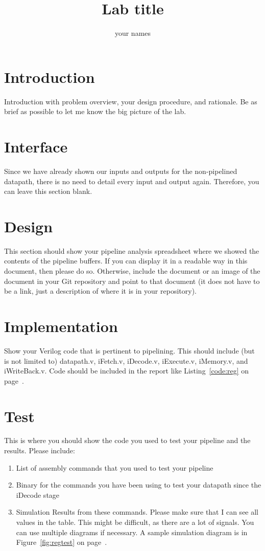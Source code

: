 \documentclass{article}
\author{your names}
\title{Lab title}
\newcommand{\Verilog}[3]{
  \lstset{language=Verilog}
  \lstset{backgroundcolor=\color{listinggray},rulecolor=\color{blue}}
  \lstset{linewidth=\textwidth}
  \lstset{commentstyle=\textit, stringstyle=\upshape,showspaces=false}
  \lstset{frame=tb}
  
}
\begin{document}
\maketitle

\section{Introduction}
Introduction with problem overview, your design procedure, and rationale.  Be as brief as possible to let me know the big picture of the lab.

\section{Interface}
Since we have already shown our inputs and outputs for the non-pipelined datapath, there is no need to detail every input and output again.  Therefore, you can leave this section blank.  

\section{Design}
This section should show your pipeline analysis spreadsheet where we showed the contents of the pipeline buffers.  If you can display it in a readable way in this document, then please do so.  Otherwise, include the document or an image of the document in your Git repository and point to that document (it does not have to be a link, just a description of where it is in your repository).

\section{Implementation}
Show your Verilog code that is pertinent to pipelining.  This should include (but is not limited to) datapath.v, iFetch.v, iDecode.v, iExecute.v, iMemory.v, and iWriteBack.v.  Code should be included in the report like Listing~\ref{code:reg} on page~\pageref{code:reg}. 

\Verilog{Verilog code for implementing a register.}{code:reg}{../code/1_fetch/register.v}

\section{Test}
This is where you should show the code you used to test your pipeline and the results.  Please include:
\begin{enumerate}
	\item List of assembly commands that you used to test your pipeline
	\item Binary for the commands you have been using to test your datapath since the iDecode stage
	\item Simulation Results from these commands.  Please make sure that I can see all values in the table.  This might be difficult, as there are a lot of signals.  You can use multiple diagrams if necessary.  A sample simulation diagram is in Figure~\ref{fig:regtest} on page~\pageref{fig:regtest}.
\end{enumerate}
\end{document}
